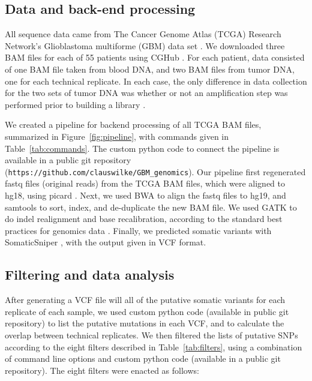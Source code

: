 \documentclass[11pt]{article} %
\begin{document}
\subsection*{Data and back-end processing}

All sequence data came from The Cancer Genome Atlas (TCGA) Research Network's Glioblastoma multiforme (GBM) data set \citep{TCGA-GBM}. We downloaded three BAM files for each of 55 patients using CGHub \citep{CGHub}. For each patient, data consisted of one BAM file taken from blood DNA, and two BAM files from tumor DNA, one for each technical replicate. In each case, the only difference in data collection for the two sets of tumor DNA was whether or not an amplification step was performed prior to building a library \citep{TCGA-GBM}. 

We created a pipeline for backend processing of all TCGA BAM files, summarized in Figure~\ref{fig:pipeline}, with commands given in Table~\ref{tab:commands}. The custom python code to connect the pipeline is available in a public 
git repository (\texttt{https://github.com/clauswilke/GBM\_genomics}). Our pipeline first regenerated fastq files (original reads) from the TCGA BAM files, which were aligned to hg18, using picard \citep{picard}. Next, we used BWA \citep{bwa} to align the fastq files to hg19, and samtools \citep{SAMtools} to sort, index, and de-duplicate the new BAM file. We used GATK \citep{GATK} to do indel realignment and base recalibration, according to the standard best practices for genomics data \citep{best-practices}. Finally, we predicted somatic variants with SomaticSniper \citep{SomaticSniper}, with the output given in VCF format.

\subsection*{Filtering and data analysis}

After generating a VCF file will all of the putative somatic variants for each replicate of each sample, we used custom python code (available in public git repository) to list the putative mutations in each VCF, and to calculate the overlap between technical replicates. We then filtered the lists of putative SNPs according to the eight filters described in Table~\ref{tab:filters}, using a combination of command line options and custom python code (available in a public git repository). The eight filters were enacted as follows: 
\end{document}
